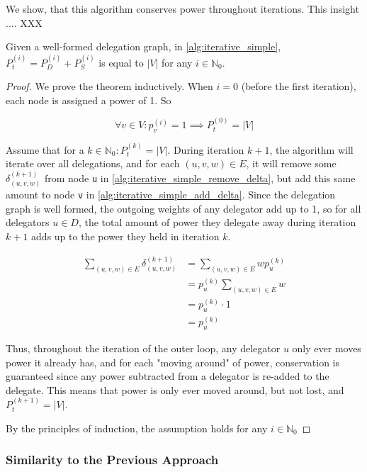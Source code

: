 We show, that this algorithm conserves power throughout iterations. This insight .... XXX 

\begin{theorem}
\label{theo:iterative_cons_of_power}
Given a well-formed delegation graph, in \cref{alg:iterative_simple}, $P_t^{(i)} = P_D^{(i)} + P_S^{(i)}$ is equal to $|V|$ for any $i \in \mathbb{N}_0$.
\end{theorem}
\begin{proof}

We prove the theorem inductively. When $i = 0$ (before the first iteration), each node is assigned a power of 1. So 

\[
\forall v \in V: p_v^{(i)} = 1 \implies P_t^{(0)} = |V|
\]

Assume that for a $k \in \mathbb{N}_0: P_t^{(k)} = |V|$. During iteration $k+1$, the algorithm will iterate over all delegations, and for each $(u, v, w) \in E$, it will remove some $\delta_{(u, v, w)}^{(k+1)}$ from node \texttt{u} in \cref{alg:iterative_simple_remove_delta}, but add this same amount to node \texttt{v} in \cref{alg:iterative_simple_add_delta}. Since the delegation graph is well formed, the outgoing weights of any delegator add up to 1, so for all delegators $u \in D$, the total amount of power they delegate away during iteration $k+1$ adds up to the power they held in iteration $k$.

\begin{align*}
\sum_{(u, v, w) \in E} \delta_{(u, v, w)}^{(k+1)} &=  \sum_{(u, v, w) \in E} wp_u^{(k)} \\
&= p_u^{(k)}  \sum_{(u, v, w) \in E} w \\
&= p_u^{(k)} \cdot 1 \\
&= p_u^{(k)}
\end{align*}

Thus, throughout the iteration of the outer loop, any delegator $u$ only ever moves power it already has, and for each "moving around" of power, conservation is guaranteed since any power subtracted from a delegator is re-added to the delegate. This means that power is only ever moved around, but not lost, and $P_t^{(k+1)} = |V|$. 

By the principles of induction, the assumption holds for any $i \in \mathbb{N}_0$
\end{proof}

\subsubsection{Similarity to the Previous Approach}

